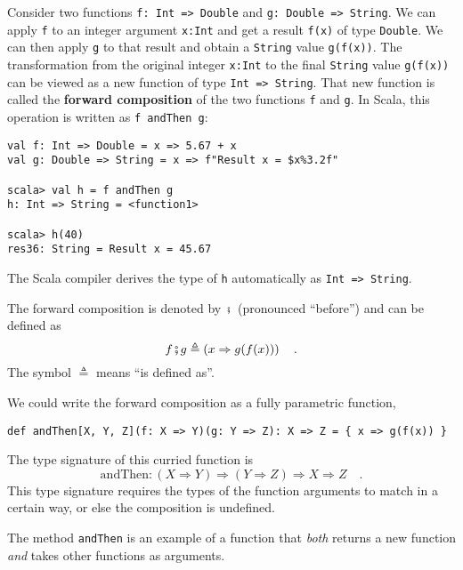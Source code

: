 Consider two functions \lstinline!f: Int => Double!
and \lstinline!g: Double => String!. We can apply \lstinline!f!
to an integer argument \lstinline!x:Int! and get a result \lstinline!f(x)!
of type \lstinline!Double!. We can then apply \lstinline!g! to that
result and obtain a \lstinline!String! value \lstinline!g(f(x))!.
The transformation from the original integer \lstinline!x:Int! to
the final \lstinline!String! value \lstinline!g(f(x))! can be viewed
as a new function of type \lstinline!Int => String!. That new function
is called the \textbf{forward composition}
of the two functions \lstinline!f! and \lstinline!g!. In Scala,
this operation is written as \lstinline!f andThen g!:
\begin{lstlisting}
val f: Int => Double = x => 5.67 + x
val g: Double => String = x => f"Result x = $x%3.2f"

scala> val h = f andThen g
h: Int => String = <function1>

scala> h(40)
res36: String = Result x = 45.67
\end{lstlisting}
The Scala compiler derives the type of \lstinline!h! automatically
as \lstinline!Int => String!.

The forward composition is denoted by $\bef$ (pronounced ``before'')
and can be defined as
\begin{equation}
f\bef g\triangleq\left(x\Rightarrow g(f(x))\right)\quad.\label{eq:def-of-forward-composition}
\end{equation}
The symbol $\triangleq$ means ``is defined as''.

We could write the forward composition as a fully parametric function,
\begin{lstlisting}
def andThen[X, Y, Z](f: X => Y)(g: Y => Z): X => Z = { x => g(f(x)) }
\end{lstlisting}
The type signature of this curried function is 
\[
\text{andThen}:\left(X\Rightarrow Y\right)\Rightarrow\left(Y\Rightarrow Z\right)\Rightarrow X\Rightarrow Z\quad.
\]
This type signature requires the types of the function arguments to
match in a certain way, or else the composition is undefined.

The method \lstinline!andThen! is an example of a function that \emph{both}
returns a new function \emph{and} takes other functions as arguments.

